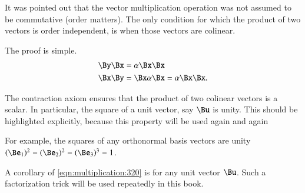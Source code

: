 %
%
It was pointed out that the vector multiplication operation was not assumed to be commutative (order matters).
The only condition for which the product of two vectors is order independent, is when those vectors are colinear.


The proof is simple.
\begin{dmath}\label{eqn:colinearVectors:380}
\begin{aligned}
\By \Bx &= \alpha \Bx \Bx \\
\Bx \By &= \Bx \alpha \Bx = \alpha \Bx \Bx.
\end{aligned}
\end{dmath}

The contraction axiom ensures that the product of two colinear vectors is a scalar.
In particular, the square of a unit vector, say \( \Bu \) is unity.
This should be highlighted explicitly, because this property will be used again and again

For example, the squares of any orthonormal basis vectors are unity \( (\Be_1)^2 = (\Be_2)^2 = (\Be_3)^3 = 1 \).

A corollary of
\cref{eqn:multiplication:320} is
for any unit vector \( \Bu \).
Such a factorization trick will be used repeatedly in this book.

